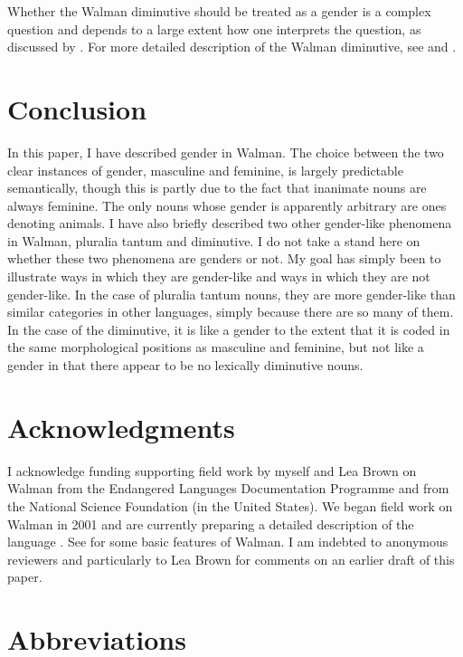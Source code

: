 \documentclass[output=collectionpaper]{langsci/langscibook}
\begin{document}
Whether the Walman diminutive should be treated as a gender is a complex question and depends to a large extent how one interprets the question, as discussed by \citet{Dryer2016}. For more detailed description of the Walman diminutive, see \citet{DryerUnderrevision} and \citet{DryerInpreparation}.

\section{Conclusion}

In this paper, I have described gender in Walman. The choice between the two clear instances of gender, masculine and feminine, is largely predictable semantically, though this is partly due to the fact that inanimate nouns are always feminine. The only nouns whose gender is apparently arbitrary are ones denoting animals. I have also briefly described two other gender-like phenomena in Walman, pluralia tantum and diminutive. I do not take a stand here on whether these two phenomena are genders or not. My goal has simply been to illustrate ways in which they are gender-like and ways in which they are not gender-like. In the case of pluralia tantum nouns, they are more gender-like than similar categories in other languages, simply because there are so many of them. In the case of the diminutive, it is like a gender to the extent that it is coded in the same morphological positions as masculine and feminine, but not like a gender in that there appear to be no lexically diminutive nouns.

\section*{Acknowledgments}
I acknowledge funding supporting field work by myself and Lea Brown on Walman from the Endangered Languages Documentation Programme and from the National Science Foundation (in the United States). We began field work on Walman in 2001 and are currently preparing a detailed description of the language \citep{DryerInpreparation}. See \citet{Brown2008} for some basic features of Walman. I am indebted to anonymous reviewers and particularly to Lea Brown for comments on an earlier draft of this paper.

\section*{Abbreviations}
\end{document}

